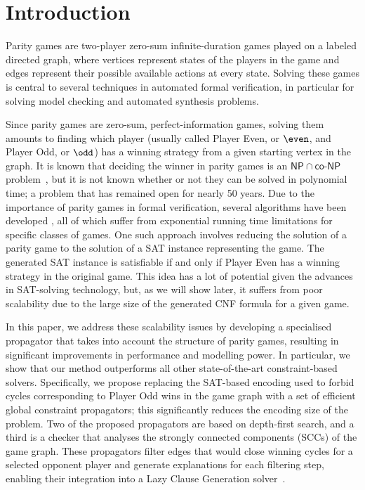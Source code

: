 \documentclass[runningheads]{llncs}
\begin{document}
\section{Introduction}

Parity games are two-player zero-sum infinite-duration games played on a labeled directed graph, where vertices represent states of the players in the game and edges represent their possible available actions at every state. 
Solving these games is central to several techniques in automated formal verification, in particular for solving model checking and automated synthesis problems.

Since parity games are zero-sum, perfect-information games, solving them amounts to finding which player (usually called Player Even, or $\even$, and Player Odd, or $\odd$) has a winning strategy from a given starting vertex in the graph. 
It is known that deciding the winner in parity games is an $\mathsf{NP} \cap \mathsf{co\textit{-}NP}$ problem~\cite{Jurdziński:1998}, but it is not known whether or not they can be solved in polynomial time; a problem that has remained open for nearly 50 years. 
%
Due to the importance of parity games in formal verification, several algorithms have been developed \cite{Aggarwal:2023,Benerecetti:2025,Jurdziński:2000,Jurdziński:2022,Zielonka:1998}, all of which suffer from exponential running time limitations for specific classes of games. 
One such approach involves reducing the solution of a parity game to the solution of a SAT instance representing the game. The generated SAT instance is satisfiable if and only if Player Even has a winning strategy in the original game. 
This idea has a lot of potential given the advances in SAT-solving technology, but, as we will show later, it suffers from poor scalability due to the large size of the generated CNF formula for a given game.

In this paper, we address these scalability issues by developing a specialised propagator that takes into account the structure of parity games, resulting in significant improvements in performance and modelling power. 
In particular, we show that our method outperforms all other state-of-the-art constraint-based solvers.
%
Specifically, we propose replacing the SAT-based encoding used to forbid cycles corresponding to Player Odd wins in the game graph \cite{Heljanko:2012} with a set of efficient global constraint propagators; this significantly reduces the encoding size of the problem. Two of the proposed propagators are based on depth-first search, and a third is a checker that analyses the strongly connected components (SCCs) of the game graph. These propagators filter edges that would close winning cycles for a selected opponent player and generate explanations for each filtering step, enabling their integration into a Lazy Clause Generation solver~\cite{DBLP:journals/constraints/OhrimenkoSC09}.
\end{document}
